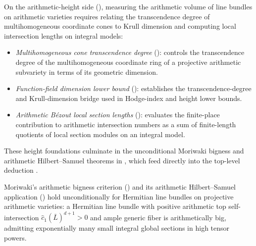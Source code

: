 On the arithmetic-height side (),
measuring the arithmetic volume of line bundles on arithmetic varieties
requires relating the transcendence degree of multihomogeneous coordinate cones
to Krull dimension and computing local intersection lengths on integral models:
\begin{itemize}
  \item \emph{Multihomogeneous cone transcendence degree}
        (): controls
        the transcendence degree of the multihomogeneous coordinate ring of a
        projective arithmetic subvariety in terms of its geometric dimension.
  \item \emph{Function-field dimension lower bound}
        ():
        establishes the transcendence-degree and Krull-dimension bridge used in
        Hodge-index and height lower bounds.
  \item \emph{Arithmetic B\'ezout local section lengths}
        ():
        evaluates the finite-place contribution to arithmetic intersection
        numbers as a sum of finite-length quotients of local section modules on
        an integral model.
\end{itemize}

These height foundations culminate in the unconditional Moriwaki bigness and
arithmetic Hilbert--Samuel theorems in
,
which feed directly into the top-level deduction
.

\begin{theorem}
\label{thm:ch02-moriwaki-big}
Moriwaki's arithmetic bigness criterion
()
and its arithmetic Hilbert--Samuel application
() hold
unconditionally for Hermitian line bundles on projective arithmetic varieties:
a Hermitian line bundle with positive arithmetic top self-intersection
$\widehat{c}_1(\overline{L})^{d+1} > 0$ and ample generic fiber is
arithmetically big, admitting exponentially many small integral global
sections in high tensor powers.
\end{theorem}

